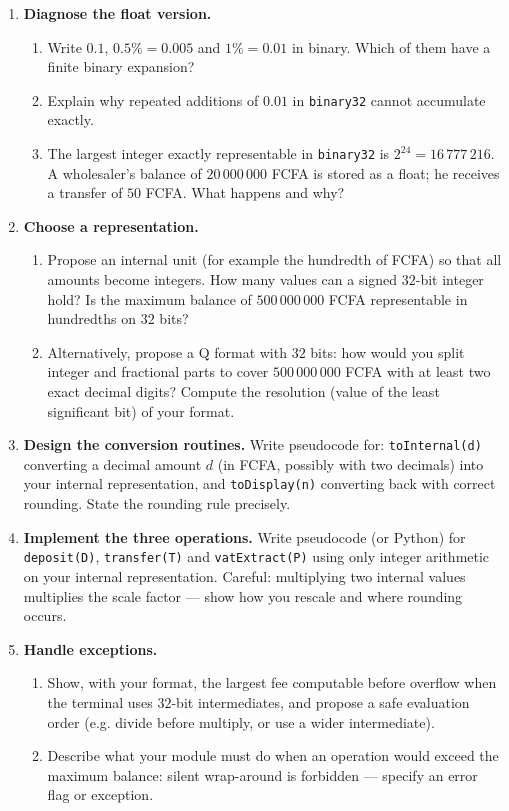 \documentclass[11pt]{article}
\begin{document}
\begin{enumerate}
\item \textbf{Diagnose the float version.}
      \begin{enumerate}
      \item Write $0.1$, $0.5\% = 0.005$ and $1\% = 0.01$ in binary. Which of them have a finite binary expansion?
      \item Explain why repeated additions of $0.01$ in \texttt{binary32} cannot accumulate exactly.
      \item The largest integer exactly representable in \texttt{binary32} is $2^{24} = 16\,777\,216$. A wholesaler's balance of $20\,000\,000$ FCFA is stored as a float; he receives a transfer of $50$ FCFA. What happens and why?
      \end{enumerate}

\item \textbf{Choose a representation.}
      \begin{enumerate}
      \item Propose an internal unit (for example the hundredth of FCFA) so that all amounts become integers. How many values can a signed $32$-bit integer hold? Is the maximum balance of $500\,000\,000$ FCFA representable in hundredths on $32$ bits?
      \item Alternatively, propose a Q format with $32$ bits: how would you split integer and fractional parts to cover $500\,000\,000$ FCFA with at least two exact decimal digits? Compute the resolution (value of the least significant bit) of your format.
      \end{enumerate}

\item \textbf{Design the conversion routines.} Write pseudocode for: \texttt{toInternal(d)} converting a decimal amount $d$ (in FCFA, possibly with two decimals) into your internal representation, and \texttt{toDisplay(n)} converting back with correct rounding. State the rounding rule precisely.

\item \textbf{Implement the three operations.} Write pseudocode (or Python) for \texttt{deposit(D)}, \texttt{transfer(T)} and \texttt{vatExtract(P)} using only integer arithmetic on your internal representation. Careful: multiplying two internal values multiplies the scale factor — show how you rescale and where rounding occurs.

\item \textbf{Handle exceptions.}
      \begin{enumerate}
      \item Show, with your format, the largest fee computable before overflow when the terminal uses $32$-bit intermediates, and propose a safe evaluation order (e.g. divide before multiply, or use a wider intermediate).
      \item Describe what your module must do when an operation would exceed the maximum balance: silent wrap-around is forbidden — specify an error flag or exception.
      \end{enumerate}


\end{enumerate}
\end{document}
